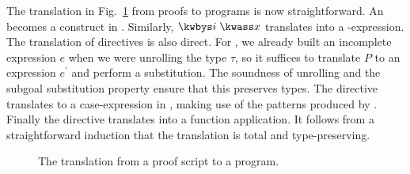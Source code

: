 The translation in Fig.~\ref{fig:translation} from proofs to \Beluga{} programs
is now straightforward. An \kwunbox{} becomes a \tletboxs
construct in \Beluga. Similarly, $\kwbys i\;\kwass x$ translates into
a \tlet-expression. The translation of directives is also direct. For
\kwintros, we already built an incomplete expression $e$ when we were unrolling
the type $\tau$, so it suffices to translate $P$ to an expression $e^\prime$ and
perform a substitution. The soundness of unrolling and the subgoal substitution
property ensure that this preserves types.
The \kwsplit{} directive translates to
a case-expression in \Beluga{}, making use of the patterns produced by \scov.
Finally the \kwsuffices{} directive translates into a function application.
It follows from a straightforward induction that the translation is total and
type-preserving.

\begin{figure}[hp]
  \caption{%
    The translation from a \Harpoon{} proof script to a \Beluga{} program.%
  }%
  \label{fig:translation}
\end{figure}%
%
